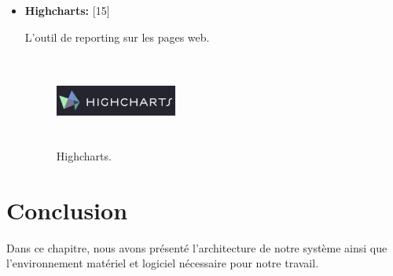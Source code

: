 \begin{itemize}
\item {  \textbf{ Highcharts:} } [15]


L'outil de \guillemotleft{} reporting \guillemotright{} sur les pages web.


\begin{figure}[H]
\center
\includegraphics[width=4cm,height=3cm]{./figures/teklogos/highcharts.png}
\caption{Highcharts.}
\end{figure}


\end{itemize}


\section{Conclusion}

Dans ce chapitre, nous avons présenté l’architecture de notre système ainsi que
l’environnement matériel et logiciel nécessaire pour notre travail.


















